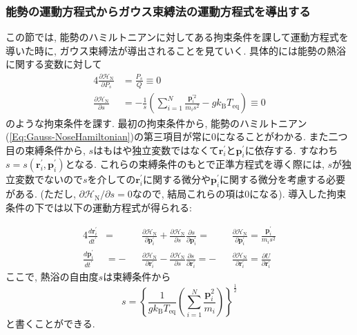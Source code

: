 \subsubsection{能勢の運動方程式からガウス束縛法の運動方程式を導出する}
この節では, 能勢のハミルトニアンに対してある拘束条件を課して運動方程式を導いた時に, ガウス束縛法が導出されることを見ていく.
具体的には能勢の熱浴に関する変数に対して
\begin{alignat}{4}
    \frac{\partial \mathcal{H}_{\mathrm{N}}}{\partial P_{s}}
    &=
    \frac{P_{s}}{Q}
    \equiv
    0
    \label{Eq:NoseHamiltonian-Constrain1}
    \\
    \frac{\partial \mathcal{H}_{\mathrm{N}}}{\partial s}
    &=
    -
    \frac{1}{s}
    \left(
        \sum_{i=1}^{N}
        \frac{\bm{p}_{i}^{\prime2}}{m_{i}s^{2}}
        -
        g k_{\mathrm{B}} T_{\mathrm{eq}}
    \right)
    \equiv
    0
    \label{Eq:NoseHamiltonian-Constrain2}
\end{alignat}
のような拘束条件を課す.
最初の拘束条件から, 能勢のハミルトニアン(\ref{Eq:Gauss-NoseHamiltonian})の第三項目が常に0になることがわかる.
また二つ目の束縛条件から, $s$はもはや独立変数ではなくて$\bm{r}_{i}^{\prime}$と$\bm{p}_{i}^{\prime}$に依存する. すなわち$s = s(\bm{r}_{i}^{\prime}, \bm{p}_{i}^{\prime})$となる.
これらの束縛条件のもとで正準方程式を導く際には, $s$が独立変数でないので$s$を介しての$\bm{r}_{i}^{\prime}$に関する微分や$\bm{p}_{i}^{\prime}$に関する微分を考慮する必要がある.
(ただし, $\partial \mathcal{H}_{\mathrm{N}}/\partial s =0$なので, 結局これらの項は0になる). 導入した拘束条件の下では以下の運動方程式が得られる:

\begin{alignat}{4}
    \frac{d \bm{r}_{i}^{\prime}}{dt^{\prime}}
    &= &&
    \frac{\partial \mathcal{H}_{\mathrm{N}}}{\partial \bm{p}_{i}^{\prime}}
    +
    \frac{\partial \mathcal{H}_{\mathrm{N}}}{\partial s}
    \frac{\partial s}{\partial \bm{p}_{i}^{\prime}}
    = &&
    \frac{\partial \mathcal{H}_{\mathrm{N}}}{\partial \bm{p}_{i}^{\prime}}
    =
    \frac{\bm{p}_{i}^{\prime}}{m_{i}s^{2}}
    \label{Eq:EoMs-Nose-Constrain1}
    \\
    \frac{d \bm{p}_{i}^{\prime}}{dt^{\prime}}
    &= -&&
    \frac{\partial \mathcal{H}_{\mathrm{N}}}{\partial \bm{r}_{i}^{\prime}}
    -
    \frac{\partial \mathcal{H}_{\mathrm{N}}}{\partial s}
    \frac{\partial s}{\partial \bm{r}_{i}^{\prime}}
    =-&&
    \frac{\partial \mathcal{H}_{\mathrm{N}}}{\partial \bm{r}_{i}^{\prime}}
    =
    \frac{\partial U}{\partial \bm{r}_{i}^{\prime}}
    \label{Eq:EoMs-Nose-Constrain2}
\end{alignat}
ここで, 熱浴の自由度$s$は束縛条件から
\begin{equation}
    s
    =
    \left\{
        \frac{1}{g k_{\mathrm{B}} T_{\mathrm{eq}}}
        \left(
            \sum_{i=1}^{N}
            \frac{\bm{p}_{i}^{2}}{m_{i}}
        \right)
    \right\}^{\frac{1}{2}}
    \label{Eq:Gauss-Nose-Constrain-s}
\end{equation}
と書くことができる.

